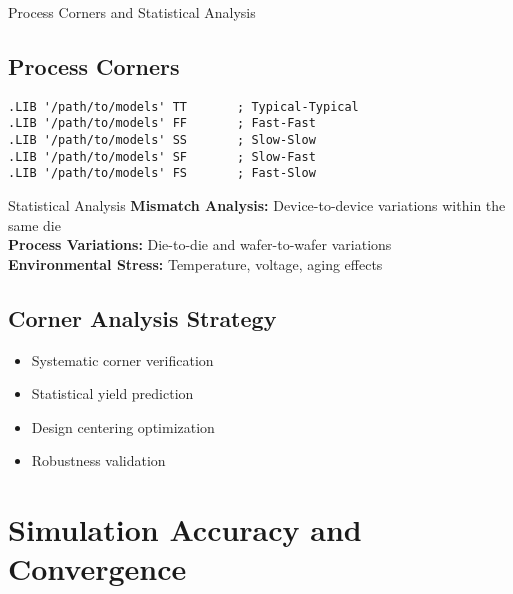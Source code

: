 \documentclass{beamer}
\begin{document}
\begin{frame}{Process Corners and Statistical Analysis}
    \subsection{Process Corners}
    \begin{lstlisting}
.LIB '/path/to/models' TT       ; Typical-Typical
.LIB '/path/to/models' FF       ; Fast-Fast  
.LIB '/path/to/models' SS       ; Slow-Slow
.LIB '/path/to/models' SF       ; Slow-Fast
.LIB '/path/to/models' FS       ; Fast-Slow
    \end{lstlisting}
    
    \begin{alertblock}{Statistical Analysis}
        \textbf{Mismatch Analysis:} Device-to-device variations within the same die \\
        \textbf{Process Variations:} Die-to-die and wafer-to-wafer variations \\
        \textbf{Environmental Stress:} Temperature, voltage, aging effects
    \end{alertblock}
    
    \subsection{Corner Analysis Strategy}
    \begin{itemize}
        \item Systematic corner verification
        \item Statistical yield prediction
        \item Design centering optimization
        \item Robustness validation
    \end{itemize}
\end{frame}

\section{Simulation Accuracy and Convergence}
\end{document}

